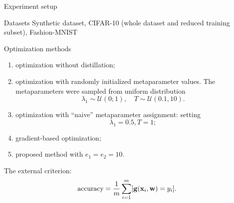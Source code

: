 \documentclass[12pt, aspectratio=169]{beamer}
\begin{document}
\begin{frame}{Experiment setup}
    
    
\begin{block}{Datasets}
    Synthetic dataset, CIFAR-10 (whole dataset and reduced training subset), Fashion-MNIST
\end{block}
    
\begin{block}{Optimization methods}
\fontsize{11}{5}\selectfont
\begin{enumerate}[{1)}]
    \item optimization without distillation;
    \item optimization with randomly initialized metaparameter values. The metaparameters were sampled from uniform distribution
    \vspace{-0.3 cm}
    $$\lambda_1 \sim \mathcal{U}(0;1), \quad T \sim \mathcal{U}(0.1, 10).$$
    \vspace{-0.5 cm}
    \item optimization with ``naive'' metaparameter assignment: setting
    \vspace{-0.3 cm}
    $$\lambda_1 = 0.5, T = 1;$$
    \vspace{-0.5 cm}
    \item gradient-based optimization;
    \item proposed method with $e_1=e_2=10$.
\end{enumerate}
\end{block}
    
\fontsize{11}{5}\selectfont
The external criterion:
\begin{equation*}
    \text{accuracy} = \frac{1}{m}\sum\limits_{i=1}^m [\mathbf{g}(\mathbf{x}_i, \mathbf{w}) = y_i].
\end{equation*}
    
\end{frame}
\end{document}

